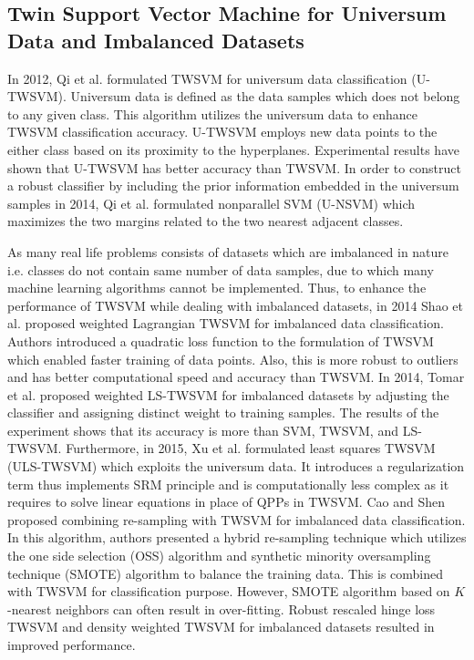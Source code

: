 \documentclass[pdflatex,sn-mathphys]{sn-jnl}%
\theoremstyle{thmstyleone}%
\theoremstyle{thmstyletwo}%
\theoremstyle{thmstylethree}%
\begin{document}
\subsection{Twin Support Vector Machine for Universum Data and Imbalanced Datasets}
\noindent
\newline
In 2012, Qi et al. \cite{qi2012twin} formulated TWSVM for universum data classification (U-TWSVM). Universum data is defined as the data samples which does not belong to any given class. This algorithm utilizes the universum data to enhance TWSVM classification accuracy. U-TWSVM employs new data points to the either  class based on its proximity to the hyperplanes. Experimental results have shown that U-TWSVM has better accuracy than TWSVM. In order to construct a robust classifier by including the prior information embedded in the universum samples in 2014, Qi et al. \cite{qi2014nonparallel} formulated nonparallel SVM (U-NSVM) which maximizes the two margins related to the two nearest adjacent classes.

As many real life problems consists of datasets which are imbalanced in nature i.e. classes do not contain same number of data samples, due to which many machine learning algorithms cannot be implemented. Thus, to enhance the performance of TWSVM while dealing with imbalanced datasets, in 2014 Shao et al. \cite{shao2014efficient} proposed weighted Lagrangian TWSVM for imbalanced data classification. Authors introduced a quadratic loss function to the formulation of TWSVM which enabled faster training of data points. Also, this is more robust to outliers and has better computational speed and accuracy than TWSVM. In 2014, Tomar et al. \cite{tomar2014weighted} proposed weighted LS-TWSVM for imbalanced datasets by adjusting the classifier and assigning distinct weight to training samples. The results of the experiment shows that its accuracy is more than SVM, TWSVM, and LS-TWSVM. Furthermore, in 2015, Xu et al. \cite{xu2016least} formulated least squares TWSVM (ULS-TWSVM) which exploits the universum data. It introduces a regularization term thus implements SRM principle and is computationally less complex as it requires to solve linear equations in place of QPPs in TWSVM. Cao and Shen \cite{cao2016combining} proposed combining re-sampling with TWSVM for imbalanced data classification. In this algorithm, authors presented a hybrid re-sampling technique which utilizes the one side selection (OSS) algorithm and synthetic minority oversampling technique (SMOTE) algorithm to balance the training data. This is combined with TWSVM for classification purpose. However, SMOTE algorithm based on $K$-nearest neighbors can often result in over-fitting. Robust rescaled hinge loss TWSVM \cite{huang2019robust} and density weighted TWSVM \cite{hazarika2021density}  for imbalanced datasets resulted in improved performance.
\end{document}

